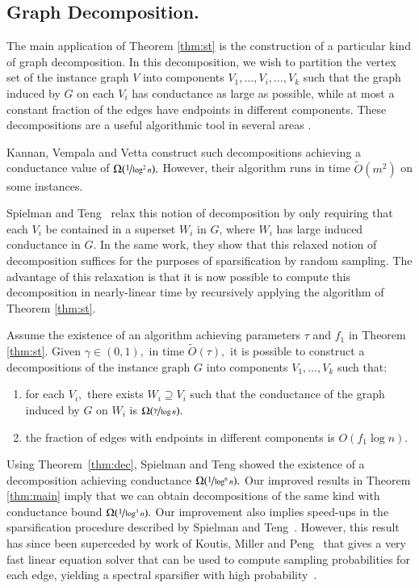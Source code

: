 \documentclass[twoside,leqno,twocolumn]{article}
\newcommand{\nfrac}{\nicefrac}
\numberwithin{equation}{section}
\begin{document}
\subsection{Graph Decomposition.} The main application of Theorem \ref{thm:st} is the construction of a particular kind of graph decomposition. In this decomposition, we wish to partition the vertex set of the instance graph $V$ into components $V_1, \ldots, V_i, \ldots, V_k$ such that the graph induced by $G$ on each $V_i$ has conductance as large as possible, while at most a constant fraction of the edges have endpoints in different components. These decompositions are a useful algorithmic tool in several areas \cite{Trevisan05, KM, ST2}.

Kannan, Vempala and Vetta \cite{Kannan} construct such decompositions achieving a conductance value of $\Omega(\nfrac{1}{\log^2 n}).$ However, their algorithm runs in time $\tilde{O}(m^2)$ on some instances. 

Spielman and Teng~\cite{ST2} relax this notion of decomposition by only requiring that each $V_i$ be contained in a superset $W_i$ in $G$, where $W_i$ has large induced conductance in $G.$ In the same work, they show that this relaxed notion of decomposition suffices for the purposes of sparsification by random sampling. The advantage of this relaxation is that it is now possible to compute this decomposition in nearly-linear time by recursively applying the algorithm of Theorem \ref{thm:st}.
\begin{theorem} \label{thm:dec} \cite{ST2} 
Assume the existence of an algorithm achieving parameters $\tau$ and $f_1$ in Theorem \ref{thm:st}. Given $\gamma \in (0,1),$ in time $\tilde{O}(\tau),$ it is possible to construct a decompositions of the instance graph $G$ into components $V_1, \ldots, V_k$ such that:
\begin{enumerate}
\item for each $V_i,$ there exists $W_i \supseteq V_i$ such that the conductance of the graph induced by $G$ on $W_i$ is  $\Omega(\nfrac{\gamma}{\log n}).$
\item the fraction of edges with endpoints in different components is $O(f_1 \log n).$
\end{enumerate}
\end{theorem}
Using Theorem~\ref{thm:dec}, Spielman and Teng showed the existence of a decomposition achieving conductance $\Omega(\nfrac{1}{\log^6 n}).$
Our improved results in Theorem \ref{thm:main} imply that we can obtain decompositions of the same kind with conductance  bound $\Omega(\nfrac{1}{\log^3 n}).$ Our improvement also implies speed-ups in the sparsification procedure described by Spielman and Teng~\cite{ST2}. However, this result has since been superceded by work of Koutis, Miller and Peng~\cite{KMP} that gives a very fast linear equation solver that can be used to compute sampling probabilities for each edge, yielding a spectral sparsifier with high probability~\cite{SS}.
\end{document}
